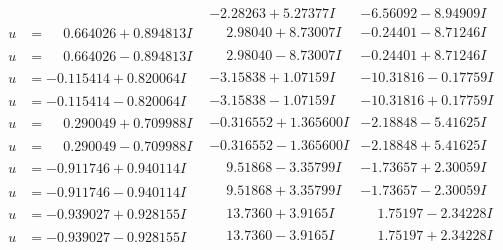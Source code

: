 \documentclass[1p]{elsarticle_modified}
\theoremstyle{definition}
\begin{document}
$$\begin{array}{c|c|c}
 & -2.28263 + 5.27377 I & -6.56092 - 8.94909 I \\ \hline\begin{aligned}
u &= \phantom{-}0.664026 + 0.894813 I\end{aligned}
 & \phantom{-}2.98040 + 8.73007 I & -0.24401 - 8.71246 I \\ \hline\begin{aligned}
u &= \phantom{-}0.664026 - 0.894813 I\end{aligned}
 & \phantom{-}2.98040 - 8.73007 I & -0.24401 + 8.71246 I \\ \hline\begin{aligned}
u &= -0.115414 + 0.820064 I\end{aligned}
 & -3.15838 + 1.07159 I & -10.31816 - 0.17759 I \\ \hline\begin{aligned}
u &= -0.115414 - 0.820064 I\end{aligned}
 & -3.15838 - 1.07159 I & -10.31816 + 0.17759 I \\ \hline\begin{aligned}
u &= \phantom{-}0.290049 + 0.709988 I\end{aligned}
 & -0.316552 + 1.365600 I & -2.18848 - 5.41625 I \\ \hline\begin{aligned}
u &= \phantom{-}0.290049 - 0.709988 I\end{aligned}
 & -0.316552 - 1.365600 I & -2.18848 + 5.41625 I \\ \hline\begin{aligned}
u &= -0.911746 + 0.940114 I\end{aligned}
 & \phantom{-}9.51868 - 3.35799 I & -1.73657 + 2.30059 I \\ \hline\begin{aligned}
u &= -0.911746 - 0.940114 I\end{aligned}
 & \phantom{-}9.51868 + 3.35799 I & -1.73657 - 2.30059 I \\ \hline\begin{aligned}
u &= -0.939027 + 0.928155 I\end{aligned}
 & \phantom{-}13.7360 + 3.9165 I & \phantom{-}1.75197 - 2.34228 I \\ \hline\begin{aligned}
u &= -0.939027 - 0.928155 I\end{aligned}
 & \phantom{-}13.7360 - 3.9165 I & \phantom{-}1.75197 + 2.34228 I \\ \hline\begin{aligned}

\end{aligned}
\end{array}$$
\end{document}
